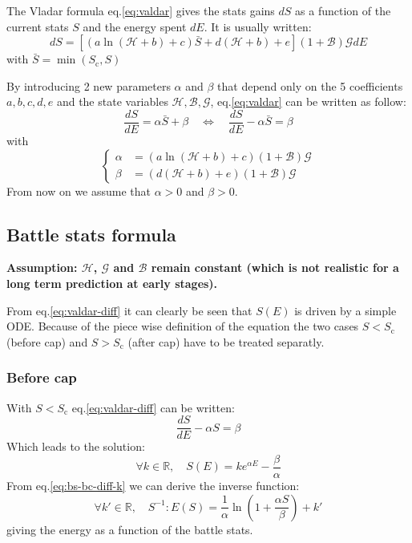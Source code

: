 \documentclass[12pt]{article}
\def\happy{\mathcal{H}}
\def\gym{\mathcal{G}}
\def\bonus{\mathcal{B}}
\def\Sc{S_\text{c}}
\begin{document}
The Vladar formula eq.\eqref{eq:valdar} gives the stats gains $dS$ as a function of the current stats $S$ and the energy spent $dE$. It is usually written:
\begin{equation}
    dS = \left[ (a\ln(\happy+b)+c) \bar{S} + d(\happy+b) + e \right](1+\bonus)\gym dE
    \label{eq:valdar}
\end{equation}
with $\bar{S} = \min(\Sc, S)$

\par By introducing 2 new parameters $\alpha$ and $\beta$ that depend only on the 5 coefficients $a, b, c, d, e$ and the state variables $\happy, \bonus, \gym$, eq.\eqref{eq:valdar} can be written as follow:
\begin{equation}
    \frac{dS}{dE} = \alpha \bar{S} + \beta \quad \Leftrightarrow \quad \frac{dS}{dE} - \alpha \bar{S} = \beta
    \label{eq:valdar-diff}
\end{equation}
with
\begin{equation}
    \left\{\begin{aligned}
        \alpha &= (a\ln(\happy+b)+c)(1+\bonus)\gym\\
        \beta &= (d(\happy+b) +e)(1+\bonus)\gym
    \end{aligned}\right.
\end{equation}
From now on we assume that $\alpha > 0$ and $\beta > 0$.

\subsection{Battle stats formula}
\par {\color{myred}\bf Assumption: $\happy$, $\gym$ and $\bonus$ remain constant (which is not realistic for a long term prediction at early stages).}

\par From eq.\eqref{eq:valdar-diff} it can clearly be seen that $S(E)$ is driven by a simple ODE. Because of the piece wise definition of the equation the two cases $S<\Sc$ (before cap) and $S>\Sc$ (after cap) have to be treated separatly.

\subsubsection{Before cap}
With $S<\Sc$ eq.\eqref{eq:valdar-diff} can be written:
\begin{equation}
    \frac{dS}{dE} -\alpha S = \beta
\end{equation}
Which leads to the solution:
\begin{equation}
    \forall k \in \mathbb{R},\quad S(E) = ke^{\alpha E} - \frac{\beta}{\alpha}
    \label{eq:bs-bc-diff-k}
\end{equation}
From eq.\eqref{eq:bs-bc-diff-k} we can derive the inverse function:
\begin{equation}
    \forall k' \in \mathbb{R},\quad S^{-1}: E(S) = \frac{1}{\alpha} \ln\left(1+ \frac{\alpha S}{\beta}\right) + k'
    \label{eq:bs-bc-diff-k-inv}
\end{equation}
giving the energy as a function of the battle stats.
\end{document}

